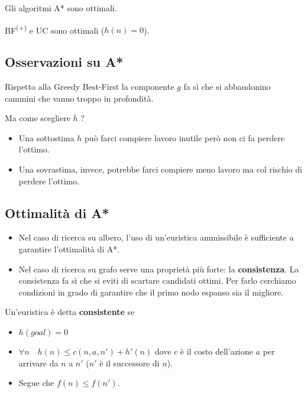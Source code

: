 \begin{theorem}
	Gli algoritmi A* sono ottimali.
\end{theorem}

\begin{corollary}
	BF\textsuperscript{(+)} e UC sono ottimali ($h(n) = 0$).
\end{corollary}

\subsection{Osservazioni su A*}
Rispetto alla Greedy Best-First la componente $g$ fa s\`i che si abbandonino cammini che
vanno troppo in profondit\`a.

Ma come scegliere $h$ ?
\begin{itemize}
	\item Una sottostima $h$ pu\`o farci compiere lavoro inutile per\`o non ci fa perdere
	      l'ottimo.
	\item Una sovrastima, invece, potrebbe farci compiere meno lavoro ma col rischio di perdere
	      l'ottimo.
\end{itemize}

\subsection{Ottimalit\`a di A*}
\begin{itemize}
	\item Nel caso di ricerca su albero, l'uso di un'euristica ammissibile \`e sufficiente a
	      garantire l'ottimalit\`a di A*.
	\item Nel caso di ricerca su grafo serve una propriet\`a pi\`u forte: la
	      \textbf{consistenza}. La consistenza fa s\`i che si eviti di scartare candidati
	      ottimi. Per farlo cerchiamo condizioni in grado di garantire che il primo nodo
	      espanso sia il migliore.
\end{itemize}

\begin{definition}
	Un'euristica \`e detta \textbf{consistente} se
	\begin{itemize}
		\item $h(goal) = 0$
		\item $\forall n \quad h(n) \leq c(n, a, n') + h'(n)$ dove $c$ \`e il costo dell'azione
		      $a$ per arrivare da $n$ a $n'$ ($n'$ \`e il successore di $n$).
		\item Segue che $f(n) \leq f(n')$.
	\end{itemize}
\end{definition}

